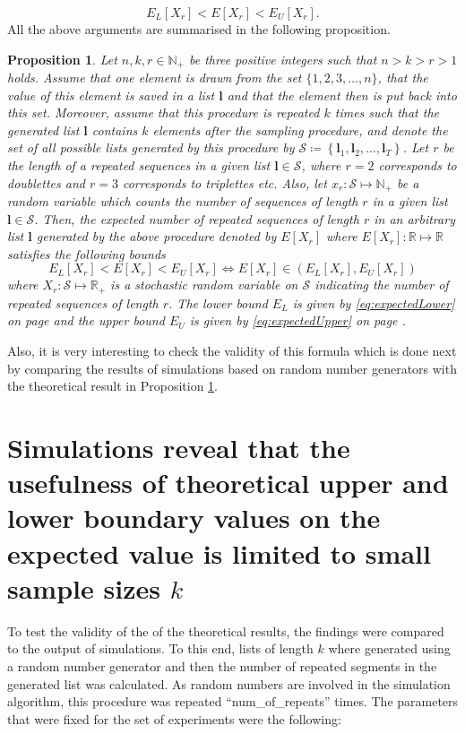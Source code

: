\documentclass{article}
\newtheorem{proposition}{Proposition}
\begin{document}
$$E_L[X_r]< E[X_r]< E_U[X_r].$$
All the above arguments are summarised in the following proposition. 


\begin{proposition}
  Let $n,k,r\in\mathbb{N}_+$ be three positive integers such that $n>k>r>1$ holds. Assume that one element is drawn from the set $\{1,2,3,\ldots,n\}$, that the value of this element is saved in a list $\mathbf{l}$ and that the element then is put back into this set. Moreover, assume that this procedure is repeated $k$ times such that the generated list $\mathbf{l}$ contains $k$ elements after the sampling procedure, and denote the set of all possible lists generated by this procedure by $\mathcal{S}\coloneqq\left\{\mathbf{l}_1,\mathbf{l}_2,\ldots,\mathbf{l}_T\right\}$. Let $r$ be the length of a repeated sequences in a given list $\mathbf{l}\in\mathcal{S}$, where $r=2$ corresponds to doublettes and $r=3$ corresponds to triplettes etc. Also, let $x_r:\mathcal{S}\mapsto\mathbb{N}_+$ be a random variable which counts the number of sequences of length $r$ in a given list $\mathbf{l}\in\mathcal{S}$. Then, the expected number of repeated sequences of length $r$ in an arbitrary list $\mathbf{l}$ generated by the above procedure denoted by $E[X_r]$ where $E[X_r]:\mathbb{R}\mapsto\mathbb{R}$ satisfies the following bounds
$$E_L[X_r]< E[X_r]< E_U[X_r]\Longleftrightarrow E[X_r]\in\left(E_L[X_r],E_U[X_r]\right)$$
  where $X_r:\mathcal{S}\mapsto\mathbb{R}_+$ is a stochastic random variable on $\mathcal{S}$ indicating the number of repeated sequences of length $r$. The lower bound $E_L$ is given by \eqref{eq:expectedLower} on page \pageref{eq:expectedLower} and the upper bound $E_U$ is given by \eqref{eq:expectedUpper} on page \pageref{eq:expectedUpper}.
  \label{prop:expectation}
\end{proposition}
Also, it is very interesting to check the validity of this formula which is done next by comparing the results of simulations based on random number generators with the theoretical result in Proposition \ref{prop:expectation}.


\section{Simulations reveal that the usefulness of theoretical upper and lower boundary values on the expected value is limited to small sample sizes $k$}
To test the validity of the of the theoretical results, the findings were compared to the output of simulations. To this end, lists of length $k$ where generated using a random number generator and then the number of repeated segments in the generated list was calculated. As random numbers are involved in the simulation algorithm, this procedure was repeated ``num\_of\_repeats'' times. The parameters that were fixed for the set of experiments were the following:
\end{document}
